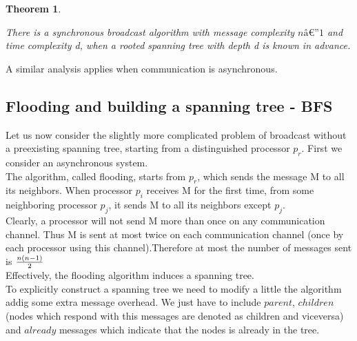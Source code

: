 \documentclass{article}
\newtheorem{thm}{Theorem}[section]
\newenvironment{theorem}{\begin{thm}\begin{rm}}%
{\end{rm}\end{thm}}
\begin{document}
\begin{theorem}
There is a synchronous broadcast algorithm with message complexity 
$n â€” 1$ and time complexity d, when a rooted spanning tree with depth d is known in 
advance. 
\end{theorem}

A similar analysis applies when communication is asynchronous. 



\subsection{Flooding and building a spanning tree - BFS}
Let us now consider the slightly more complicated problem of broadcast 
without a preexisting spanning tree, starting from a distinguished processor $p_r$. First 
we consider an asynchronous system. \\
The algorithm, called flooding, starts from $p_r$, which sends the message M to all 
its neighbors. When processor $p_i$ receives M for the first time, from some neighboring processor $p_j$, it sends M to all its 
neighbors except $p_j$.\\
Clearly, a processor will not send M more than once on any communication 
channel. Thus M is sent at most twice on each communication channel (once 
by each processor using this channel).Therefore at most the number of messages sent is ${n(n-1) \over 2}$\\
Effectively, the flooding algorithm induces a spanning tree.\\
To explicitly construct a spanning tree we need to modify a little the algorithm addig some extra message overhead. We just have to include $parent$, $children$ (nodes which respond with this messages are denoted as children and viceversa)  and $already$ messages which indicate that the nodes is already in the tree.\\
\end{document}
